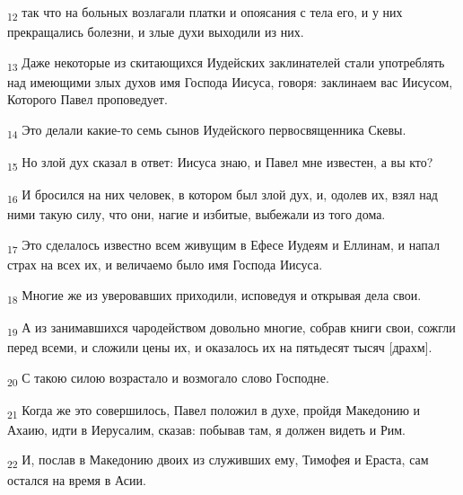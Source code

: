 \begin{tcolorbox}
\textsubscript{12} так что на больных возлагали платки и опоясания с тела его, и у них прекращались болезни, и злые духи выходили из них.
\end{tcolorbox}
\begin{tcolorbox}
\textsubscript{13} Даже некоторые из скитающихся Иудейских заклинателей стали употреблять над имеющими злых духов имя Господа Иисуса, говоря: заклинаем вас Иисусом, Которого Павел проповедует.
\end{tcolorbox}
\begin{tcolorbox}
\textsubscript{14} Это делали какие-то семь сынов Иудейского первосвященника Скевы.
\end{tcolorbox}
\begin{tcolorbox}
\textsubscript{15} Но злой дух сказал в ответ: Иисуса знаю, и Павел мне известен, а вы кто?
\end{tcolorbox}
\begin{tcolorbox}
\textsubscript{16} И бросился на них человек, в котором был злой дух, и, одолев их, взял над ними такую силу, что они, нагие и избитые, выбежали из того дома.
\end{tcolorbox}
\begin{tcolorbox}
\textsubscript{17} Это сделалось известно всем живущим в Ефесе Иудеям и Еллинам, и напал страх на всех их, и величаемо было имя Господа Иисуса.
\end{tcolorbox}
\begin{tcolorbox}
\textsubscript{18} Многие же из уверовавших приходили, исповедуя и открывая дела свои.
\end{tcolorbox}
\begin{tcolorbox}
\textsubscript{19} А из занимавшихся чародейством довольно многие, собрав книги свои, сожгли перед всеми, и сложили цены их, и оказалось их на пятьдесят тысяч [драхм].
\end{tcolorbox}
\begin{tcolorbox}
\textsubscript{20} С такою силою возрастало и возмогало слово Господне.
\end{tcolorbox}
\begin{tcolorbox}
\textsubscript{21} Когда же это совершилось, Павел положил в духе, пройдя Македонию и Ахаию, идти в Иерусалим, сказав: побывав там, я должен видеть и Рим.
\end{tcolorbox}
\begin{tcolorbox}
\textsubscript{22} И, послав в Македонию двоих из служивших ему, Тимофея и Ераста, сам остался на время в Асии.
\end{tcolorbox}

